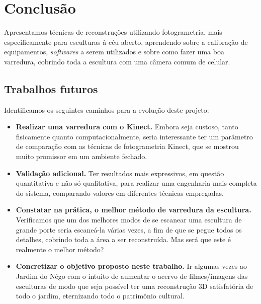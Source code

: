 \chapter*{Conclusão}
Apresentamos técnicas de reconstruções utilizando fotogrametria, mais especificamente para esculturas à céu aberto, aprendendo sobre a calibração de equipamentos, {\it softwares} a serem utilizados e sobre como fazer uma boa varredura, cobrindo toda a escultura com uma câmera comum de celular.

\section*{Trabalhos futuros} Identificamos os seguintes caminhos para a evolução deste projeto:
\begin{itemize}
\item \textbf{Realizar uma varredura com o Kinect.} Embora seja custoso, tanto fisicamente quanto computacionalmente, seria interessante ter um parâmetro de comparação com as técnicas de fotogrametria Kinect, que se mostrou muito promissor em um ambiente fechado.
 \item \textbf{Validação adicional.} Ter resultados mais expressivos, em questão quantitativa e não só qualitativa, para realizar uma engenharia mais completa do sistema, comparando valores em diferentes técnicas empregadas.
\item \textbf{Constatar na prática, o melhor método de varredura da escultura.} Verificamos que um dos melhores modos de se escanear uma escultura de grande porte seria escaneá-la várias vezes, a fim de que se pegue todos os detalhes, cobrindo toda a área a ser reconstruída. Mas será que este é realmente o melhor método? 
\item \textbf{Concretizar o objetivo proposto neste trabalho.} Ir algumas vezes ao Jardim do Nêgo com o intuito de aumentar o acervo de filmes/imagens das esculturas de modo que seja possível ter uma reconstrução 3D satisfatória de todo o jardim, eternizando todo o patrimônio cultural.
\end{itemize}
